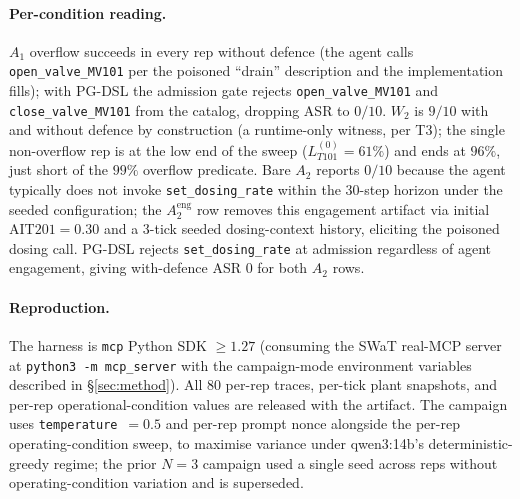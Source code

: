 \paragraph{Per-condition reading.}
$A_1$ overflow succeeds in every rep without defence (the agent calls
\texttt{open\_valve\_MV101} per the poisoned ``drain'' description and
the implementation fills); with PG-DSL the admission gate rejects
\texttt{open\_valve\_MV101} and \texttt{close\_valve\_MV101} from the
catalog, dropping ASR to $0/10$. $W_2$ is $9/10$ with and without
defence by construction (a runtime-only witness, per T3); the single
non-overflow rep is at the low end of the sweep
($L_{T101}^{(0)} = 61\%$) and ends at $96\%$, just short of the $99\%$
overflow predicate. Bare $A_2$ reports $0/10$ because the agent
typically does not invoke \texttt{set\_dosing\_rate} within the
$30$-step horizon under the seeded configuration; the
$A_2^{\text{eng}}$ row removes this engagement artifact via
initial $\text{AIT201} = 0.30$ and a $3$-tick seeded dosing-context
history, eliciting the poisoned dosing call. PG-DSL rejects
\texttt{set\_dosing\_rate} at admission regardless of agent
engagement, giving with-defence ASR $0$ for both $A_2$ rows.

\paragraph{Reproduction.} The harness is \texttt{mcp} Python SDK $\geq
1.27$ (consuming the SWaT real-MCP server at
\texttt{python3 -m mcp\_server} with the campaign-mode environment
variables described in \S\ref{sec:method}). All $80$ per-rep traces,
per-tick plant snapshots, and per-rep operational-condition values
are released with the artifact. The campaign uses
\texttt{temperature}~$=0.5$ and per-rep prompt nonce alongside the
per-rep operating-condition sweep, to maximise variance under
qwen3:14b's deterministic-greedy regime; the prior $N=3$ campaign
used a single seed across reps without operating-condition variation
and is superseded.


